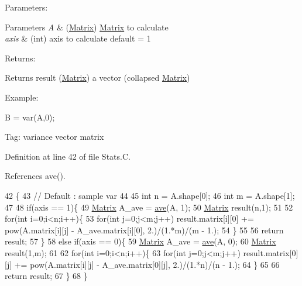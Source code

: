 Parameters\+: 
\begin{DoxyParams}{Parameters}
{\em A} & (\hyperlink{classMatrix}{Matrix}) \hyperlink{classMatrix}{Matrix} to calculate \\
\hline
{\em axis} & (int) axis to calculate default = 1\\
\hline
\end{DoxyParams}
Returns\+: \begin{DoxyReturn}{Returns}
result (\hyperlink{classMatrix}{Matrix}) a vector (collapsed \hyperlink{classMatrix}{Matrix})
\end{DoxyReturn}
Example\+:

B = var(\+A,0);

Tag\+: variance vector matrix 

Definition at line 42 of file Stats.\+C.



References ave().


\begin{DoxyCode}
42                               \{
43   \textcolor{comment}{// Default : sample var}
44 
45   \textcolor{keywordtype}{int} n = A.shape[0];
46   \textcolor{keywordtype}{int} m = A.shape[1];
47 
48   \textcolor{keywordflow}{if}(axis == 1)\{
49     \hyperlink{classMatrix}{Matrix} A\_ave = \hyperlink{Stats_8C_ae39b64f2f2f119f1fd195d6ca0583a6f}{ave}(A, 1);
50     \hyperlink{classMatrix}{Matrix} result(n,1);
51 
52     \textcolor{keywordflow}{for}(\textcolor{keywordtype}{int} i=0;i<n;i++)\{
53       \textcolor{keywordflow}{for}(\textcolor{keywordtype}{int} j=0;j<m;j++) result.matrix[i][0] += pow(A.matrix[i][j] - A\_ave.matrix[i][0], 2.)/(1.*m)/(m - 
      1.);
54     \}
55 
56     \textcolor{keywordflow}{return} result;
57   \}
58   \textcolor{keywordflow}{else} \textcolor{keywordflow}{if}(axis == 0)\{
59     \hyperlink{classMatrix}{Matrix} A\_ave = \hyperlink{Stats_8C_ae39b64f2f2f119f1fd195d6ca0583a6f}{ave}(A, 0);
60     \hyperlink{classMatrix}{Matrix} result(1,m);
61     
62     \textcolor{keywordflow}{for}(\textcolor{keywordtype}{int} i=0;i<n;i++)\{
63       \textcolor{keywordflow}{for}(\textcolor{keywordtype}{int} j=0;j<m;j++) result.matrix[0][j] += pow(A.matrix[i][j] - A\_ave.matrix[0][j], 2.)/(1.*n)/(n - 
      1.);
64     \}
65 
66     \textcolor{keywordflow}{return} result;
67   \}
68 \}
\end{DoxyCode}

